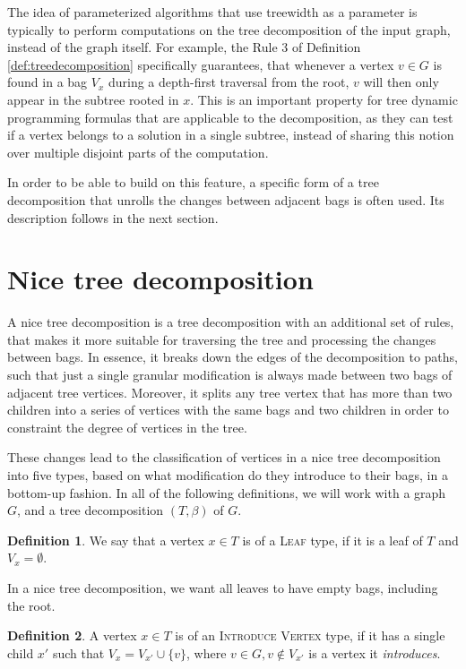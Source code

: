 \documentclass[thesis=M,english,hidelinks]{FITthesis}[2012/10/20]
\theoremstyle{definition}
\newtheorem{definition}{Definition}
\begin{document}
The idea of parameterized algorithms that use treewidth as a parameter is typically to perform computations on the tree
decomposition of the input graph, instead of the graph itself. For example, the Rule 3 of Definition
\ref{def:treedecomposition} specifically guarantees, that whenever a vertex $v \in G$ is found in a bag $V_x$ during a
depth-first traversal from the root, $v$ will then only appear in the subtree rooted in $x$. This is an important
property for tree dynamic programming formulas that are applicable to the decomposition, as they can test if a vertex
belongs to a solution in a single subtree, instead of sharing this notion over multiple disjoint parts of the
computation.

In order to be able to build on this feature, a specific form of a tree decomposition that unrolls the changes between
adjacent bags is often used. Its description follows in the next section.

\section{Nice tree decomposition}

A nice tree decomposition is a tree decomposition with an additional set of rules, that makes it more suitable for
traversing the tree and processing the changes between bags. In essence, it breaks down the edges of the decomposition
to paths, such that just a single granular modification is always made between two bags of adjacent tree vertices.
Moreover, it splits any tree vertex that has more than two children into a series of vertices with the same bags and two
children in order to constraint the degree of vertices in the tree.

These changes lead to the classification of vertices in a nice tree decomposition into five types, based on what
modification do they introduce to their bags, in a bottom-up fashion. In all of the following definitions, we will work
with a graph $G$, and a tree decomposition $(T, \beta)$ of $G$.

\begin{definition}
    \label{def:leaf}
    We say that a vertex $x \in T$ is of a \textsc{Leaf} type, if it is a leaf of $T$ and $V_x = \emptyset$.
\end{definition}

In a nice tree decomposition, we want all leaves to have empty bags, including the root.

\begin{definition}
    A vertex $x \in T$ is of an \textsc{Introduce Vertex} type, if it has a single child $x'$ such that $V_x = V_{x'}
    \cup \{v\}$, where $v \in G, v \notin V_{x'}$ is a vertex it \emph{introduces}.
\end{definition}
\end{document}
